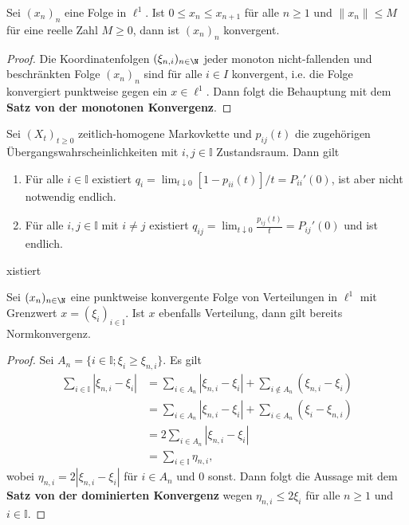 \begin{prop}
Sei $(x_n)_n$ eine Folge in $\ell^1$. Ist $0\leq x_n\leq x_{n+1}$ für alle $n\geq 1$ und $\|x_n\|\leq M$ für eine reelle Zahl $M\geq0$, dann ist $(x_n)_n$ konvergent. 
\end{prop}

\begin{proof}
Die Koordinatenfolgen $(\xi_{n,i})_{n\in\N}$ jeder monoton nicht-fallenden und beschränkten Folge $(x_n)_n$ sind für alle $i\in I$ konvergent, i.e. die Folge konvergiert punktweise gegen ein $x\in \ell^1$. Dann folgt die Behauptung mit dem \textbf{Satz von der monotonen Konvergenz}.
\end{proof}



\begin{prop}
Sei $(X_t)_{t\geq0}$ zeitlich-homogene Markovkette und $p_{ij}(t)$ die zugehörigen Übergangswahrscheinlichkeiten mit $i,j\in\mathbb I$ Zustandsraum. Dann gilt
\begin{enumerate}
\item  Für alle $i\in\mathbb I$ existiert $q_i=\lim_{t\downarrow 0}[1-p_{ii}(t)]/t=P_{ii}'(0)$, ist aber nicht notwendig endlich.
\item Für alle $i,j\in\mathbb I$ mit $i\neq j$ existiert $q_{ij}=\lim_{t\downarrow 0}\frac{p_{ij}(t)}{t}=P_{ij}'(0)$ und ist endlich.
\end{enumerate}
xistiert
\end{prop}


\begin{lem}
  Sei $(x_n)_{n\in\N}$ eine punktweise konvergente Folge von Verteilungen in $\ell^1$ mit Grenzwert $x=(\xi_i)_{i\in\mathbb I}$. Ist $x$ ebenfalls Verteilung, dann gilt bereits Normkonvergenz.
\end{lem}

\begin{proof}
Sei $A_n= \{i\in \mathbb I; \xi_i\geq \xi_{n,i}\}$. Es gilt 
\begin{align*}
\sum_{i\in\mathbb I}|\xi_{n,i}-\xi_i|
&=\sum_{i\in A_n}|\xi_{n,i}-\xi_i|+\sum_{i\not\in A_n}(\xi_{n,i}-\xi_i)\\
&=\sum_{i\in A_n}|\xi_{n,i}-\xi_i|  +\sum_{i\in A_n}(\xi_i -\xi_{n,i})\\
&= 2\sum_{i\in A_n}|\xi_{n,i}-\xi_i|\\
&=\sum_{i\in\mathbb I}\eta_{n,i},
\end{align*}
wobei $\eta_{n,i}=2|\xi_{n,i}-\xi_i|$ für $i\in A_n$ und $0$ sonst. Dann folgt die Aussage mit dem \textbf{Satz von der dominierten Konvergenz} wegen $\eta_{n,i}\leq 2\xi_i$ für alle $n\geq1 $ und $i\in \mathbb I$.
\end{proof}



